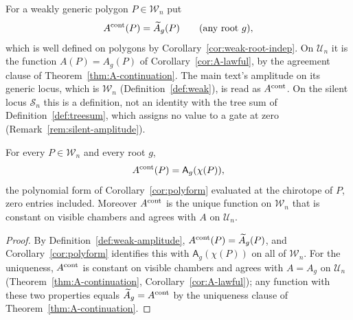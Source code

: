 \begin{definition}\label{def:weak-amplitude}
For a weakly generic polygon $P\in\mathcal W_n$ put
\begin{equation}\label{eq:weak-amplitude}
A^{\rm cont}(P)=\widetilde A_g(P)\qquad(\text{any root }g),
\end{equation}
which is well defined on polygons by Corollary~\ref{cor:weak-root-indep}.
On $\mathcal U_n$ it is the function $A(P)=A_g(P)$ of
Corollary~\ref{cor:A-lawful}, by the agreement clause of
Theorem~\ref{thm:A-continuation}. The main text's amplitude on its generic
locus, which is $\mathcal W_n$ (Definition~\ref{def:weak}), is read as
$A^{\rm cont}$. On the silent locus $\mathcal S_n$ this is a definition,
not an identity with the tree sum of Definition~\ref{def:treesum}, which
assigns no value to a gate at zero (Remark~\ref{rem:silent-amplitude}).
\end{definition}

\begin{corollary}\label{cor:weak-amplitude}
For every $P\in\mathcal W_n$ and every root $g$,
\begin{equation}\label{eq:weak-amplitude-polynomial}
A^{\rm cont}(P)=\mathsf A_g(\chi(P)),
\end{equation}
the polynomial form of Corollary~\ref{cor:polyform} evaluated at the
chirotope of $P$, zero entries included. Moreover $A^{\rm cont}$ is the
unique function on $\mathcal W_n$ that is constant on visible chambers and
agrees with $A$ on $\mathcal U_n$.
\end{corollary}
\begin{proof}
By Definition~\ref{def:weak-amplitude}, $A^{\rm cont}(P)=\widetilde A_g(P)$,
and Corollary~\ref{cor:polyform} identifies this with $\mathsf A_g(\chi(P))$
on all of $\mathcal W_n$. For the uniqueness, $A^{\rm cont}$ is constant on
visible chambers and agrees with $A=A_g$ on $\mathcal U_n$
(Theorem~\ref{thm:A-continuation}, Corollary~\ref{cor:A-lawful}); any
function with these two properties equals $\widetilde A_g=A^{\rm cont}$ by
the uniqueness clause of Theorem~\ref{thm:A-continuation}.
\end{proof}


